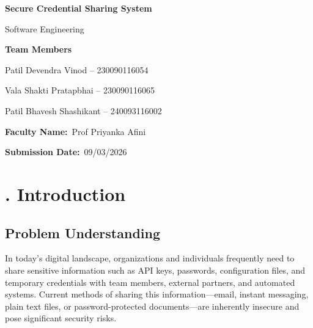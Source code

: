 \documentclass[12pt,a4paper]{article}
\title{\fontsize{16pt}{1.2}\selectfont \projecttitle}
\author{\subjectname\\[0.5em]
  Team Members: \teammemberone, \teammembertwo, \teammemberthree\\
  Faculty: \facultyname\\
  Date: \submissiondate}
\date{}
\newcommand{\projecttitle}{Secure Credential Sharing System}
\newcommand{\subjectname}{Software Engineering}
\newcommand{\facultyname}{Prof Priyanka Afini}
\newcommand{\submissiondate}{09/03/2026}
\newcommand{\teammemberone}{Patil Devendra Vinod -- 230090116054}
\newcommand{\teammembertwo}{Vala Shakti Pratapbhai -- 230090116065}
\newcommand{\teammemberthree}{Patil Bhavesh Shashikant -- 240093116002}
\begin{document}
\begin{titlepage}
  \centering
  \vspace*{2cm}
  {\fontsize{20pt}{1.2}\selectfont \textbf{\projecttitle}\par}
  \vspace{1.5cm}
  {\fontsize{14pt}{1.2}\selectfont \subjectname\par}
  \vspace{2cm}
  {\fontsize{12pt}{1.5}\selectfont
    \textbf{Team Members}\par
    \teammemberone\par
    \teammembertwo\par
    \teammemberthree\par
  }
  \vspace{1.5cm}
  {\fontsize{12pt}{1.5}\selectfont
    \textbf{Faculty Name:}\ \facultyname\par
    \textbf{Submission Date:}\ \submissiondate\par
  }
  \vfill
\end{titlepage}

\pagestyle{fancy}
\setcounter{page}{2}

\tableofcontents
\newpage

\setcounter{page}{1}

\fontsize{12pt}{1.2}\selectfont

\section*{\fontsize{16pt}{1.2}. Introduction}

\subsection*{\fontsize{14pt}{1.2} Problem Understanding}

In today's digital landscape, organizations and individuals frequently need to share sensitive information such as API keys, passwords, configuration files, and temporary credentials with team members, external partners, and automated systems. Current methods of sharing this information---email, instant messaging, plain text files, or password-protected documents---are inherently insecure and pose significant security risks.
\end{document}
